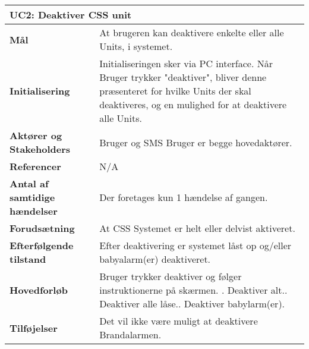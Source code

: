 \begin{table}[H] \centering
\begin{tabular}{|p{6cm}|p{8cm}|}
	\hline
\multicolumn{2}{|l|}{\textbf{UC2: Deaktiver CSS unit}} \\\hline
\textbf{Mål}	&
At brugeren kan deaktivere enkelte eller alle Units, i systemet.
\\\hline
\textbf{Initialisering} &
Initialiseringen sker via PC interface. Når Bruger trykker "deaktiver", bliver denne
præsenteret for hvilke Units der skal deaktiveres, og en mulighed for at deaktivere alle
Units. 
\\\hline
\textbf{Aktører og Stakeholders}	&
Bruger og SMS Bruger er begge hovedaktører.
\\\hline
\textbf{Referencer} &
N/A
\\\hline
\textbf{Antal af samtidige hændelser} &
Der foretages kun 1 hændelse af gangen.
\\\hline
\textbf{Forudsætning} &
At CSS Systemet er helt eller delvist aktiveret.
\\\hline
\textbf{Efterfølgende tilstand} &
Efter deaktivering er systemet låst op og/eller babyalarm(er) deaktiveret.
\\\hline
\textbf{Hovedforløb}	&
Bruger trykker deaktiver og følger instruktionerne på skærmen. \newline
1. Deaktiver alt.\newline
2. Deaktiver alle låse.\newline
3. Deaktiver babylarm(er).\newline
\\\hline
\textbf{Tilføjelser}	&
Det vil ikke være muligt at deaktivere Brandalarmen.
\\\hline
	\end{tabular}
	\label{tab:UC2} 
\end{table}